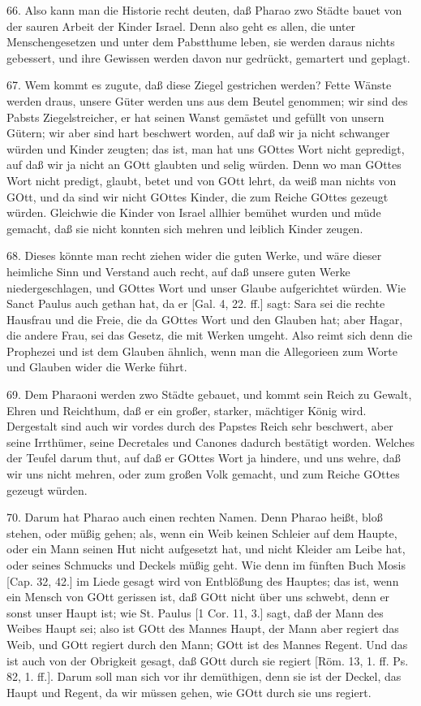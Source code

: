 66. Also kann man die Historie recht deuten, daß Pharao zwo Städte bauet von der sauren Arbeit der Kinder Israel. Denn also geht es allen, die unter Menschengesetzen und unter dem Pabstthume leben, sie werden daraus nichts gebessert, und ihre Gewissen werden davon nur gedrückt, gemartert und geplagt.

67. Wem kommt es zugute, daß diese Ziegel gestrichen werden? Fette Wänste werden draus, unsere Güter werden uns aus dem Beutel genommen; wir sind des Pabsts Ziegelstreicher, er hat seinen Wanst gemästet und gefüllt von unsern Gütern; wir aber sind hart beschwert worden, auf daß wir ja nicht schwanger würden und Kinder zeugten; das ist, man hat uns GOttes Wort nicht gepredigt, auf daß wir ja nicht an GOtt glaubten und selig würden. Denn wo man GOttes Wort nicht predigt, glaubt, betet und von GOtt lehrt, da weiß man nichts von GOtt, und da sind wir nicht GOttes Kinder, die zum Reiche GOttes gezeugt würden. Gleichwie die Kinder von Israel allhier bemühet wurden und müde gemacht, daß sie nicht konnten sich mehren und leiblich Kinder zeugen.

68. Dieses könnte man recht ziehen wider die guten Werke, und wäre dieser heimliche Sinn und Verstand auch recht, auf daß unsere guten Werke niedergeschlagen, und GOttes Wort und
unser Glaube aufgerichtet würden. Wie Sanct Paulus auch gethan hat, da er [Gal. 4, 22. ff.] sagt: Sara sei die rechte Hausfrau und die Freie, die da GOttes Wort und den Glauben hat; aber Hagar, die andere Frau, sei das Gesetz, die mit Werken umgeht. Also reimt sich denn die Prophezei und ist dem Glauben ähnlich, wenn man die Allegorieen zum Worte und Glauben wider die Werke führt.

69. Dem Pharaoni werden zwo Städte gebauet, und kommt sein Reich zu Gewalt, Ehren und Reichthum, daß er ein großer, starker, mächtiger König wird. Dergestalt sind auch wir vordes durch des Papstes Reich sehr beschwert, aber seine Irrthümer, seine Decretales und Canones dadurch bestätigt worden. Welches der Teufel darum thut, auf daß er GOttes Wort ja hindere, und uns wehre, daß wir uns nicht mehren, oder zum großen Volk gemacht, und zum Reiche GOttes gezeugt würden.

70. Darum hat Pharao auch einen rechten Namen. Denn Pharao heißt, bloß stehen, oder müßig gehen; als, wenn ein Weib keinen Schleier auf dem Haupte, oder ein Mann seinen Hut nicht aufgesetzt hat, und nicht Kleider am Leibe hat, oder seines Schmucks und Deckels müßig geht. Wie denn im fünften Buch Mosis [Cap. 32, 42.] im Liede gesagt wird von Entblößung des Hauptes; das ist, wenn ein Mensch von GOtt gerissen ist, daß GOtt nicht über uns schwebt, denn er sonst unser Haupt ist; wie St. Paulus [1 Cor. 11, 3.] sagt, daß der Mann des Weibes Haupt sei; also ist GOtt des Mannes Haupt, der Mann aber regiert das Weib, und GOtt regiert durch den Mann; GOtt ist des Mannes Regent. Und das ist auch von der Obrigkeit gesagt, daß GOtt durch sie regiert [Röm. 13, 1. ff. Ps. 82, 1. ff.]. Darum soll man sich vor ihr demüthigen, denn sie ist der Deckel, das Haupt und Regent, da wir müssen gehen, wie GOtt durch sie uns regiert.

